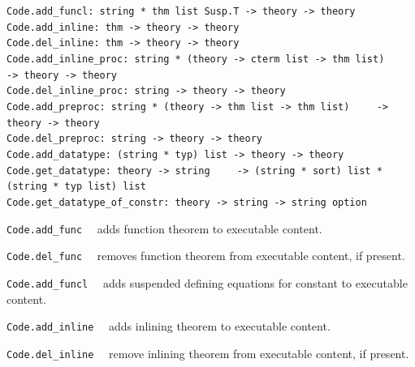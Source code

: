 \begin{isabellebody}
\begin{isamarkuptext}
\begin{mldecls}
  \verb|Code.add_funcl: string * thm list Susp.T -> theory -> theory| \\
  \verb|Code.add_inline: thm -> theory -> theory| \\
  \verb|Code.del_inline: thm -> theory -> theory| \\
  \verb|Code.add_inline_proc: string * (theory -> cterm list -> thm list)|\isasep\isanewline%
\verb|    -> theory -> theory| \\
  \verb|Code.del_inline_proc: string -> theory -> theory| \\
  \verb|Code.add_preproc: string * (theory -> thm list -> thm list)|\isasep\isanewline%
\verb|    -> theory -> theory| \\
  \verb|Code.del_preproc: string -> theory -> theory| \\
  \verb|Code.add_datatype: (string * typ) list -> theory -> theory| \\
  \verb|Code.get_datatype: theory -> string|\isasep\isanewline%
\verb|    -> (string * sort) list * (string * typ list) list| \\
  \verb|Code.get_datatype_of_constr: theory -> string -> string option|
  \end{mldecls}

  \begin{description}

  \item \verb|Code.add_func|~~ adds function
     theorem  to executable content.

  \item \verb|Code.del_func|~~ removes function
     theorem  from executable content, if present.

  \item \verb|Code.add_funcl|~~ adds
     suspended defining equations  for constant
      to executable content.

  \item \verb|Code.add_inline|~~ adds
     inlining theorem  to executable content.

  \item \verb|Code.del_inline|~~ remove
     inlining theorem  from executable content, if present.


\end{description}
\end{isamarkuptext}
\end{isabellebody}

